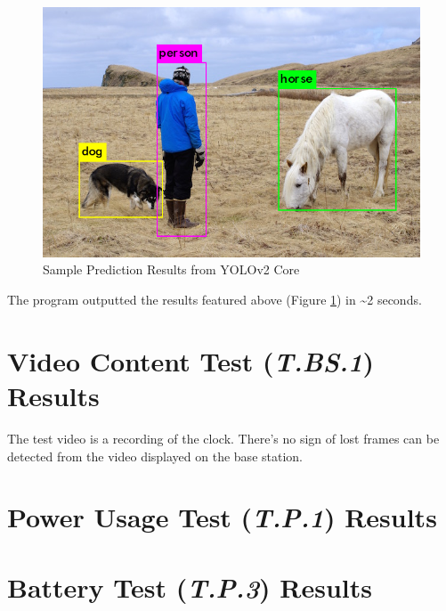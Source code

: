 \documentclass[10pt,letterpaper]{article}
\begin{document}
\begin{figure}[H]
\centering
\includegraphics[width=12.5cm]{img/pred.png}
\caption{Sample Prediction Results from YOLOv2 Core}
\label{ml_demo}
\end{figure} 
 
The program outputted the results featured above (Figure \ref{ml_demo}) in \textasciitilde 2 seconds.

\section{Video Content Test (\textit{T.BS.1}) Results}\label{appendix:T.BS.1}


The test video is a recording of the clock. There's no sign of lost frames can be detected from the video displayed on the base station.
 
 \section{Power Usage Test (\textit{T.P.1}) Results}\label{appendix:T.P.1}
 
 \section{Battery Test (\textit{T.P.3}) Results}\label{appendix:T.P.3}
 

\end{document}
